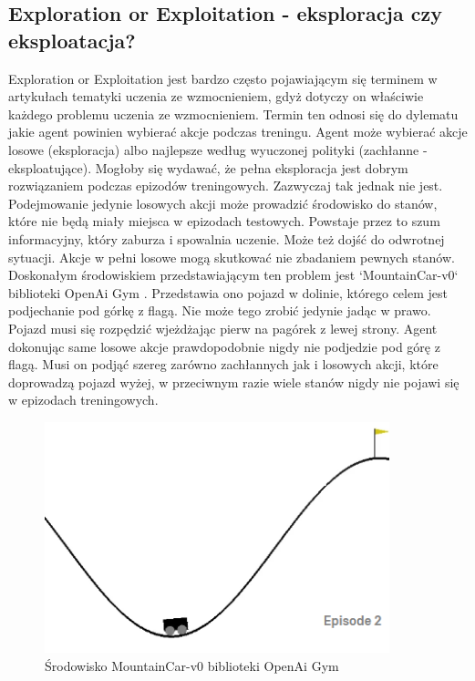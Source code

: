 \documentclass[12pt]{book}
\theoremstyle{plain}
\begin{document}
\subsection*{Exploration or Exploitation - eksploracja czy eksploatacja?}
Exploration or Exploitation jest bardzo często pojawiającym się terminem w artykułach tematyki uczenia ze wzmocnieniem\cite{exploration_or_exploitation}, gdyż dotyczy on właściwie każdego problemu uczenia ze wzmocnieniem. Termin ten odnosi się do dylematu jakie agent powinien wybierać akcje podczas treningu. Agent może wybierać akcje losowe (eksploracja) albo najlepsze według wyuczonej polityki (zachłanne - eksploatujące). Mogłoby się wydawać, że pełna eksploracja jest dobrym rozwiązaniem podczas epizodów treningowych. Zazwyczaj tak jednak nie jest. Podejmowanie jedynie losowych akcji może prowadzić środowisko do stanów, które nie będą miały miejsca w epizodach testowych. Powstaje przez to szum informacyjny, który zaburza i spowalnia uczenie. Może też dojść do odwrotnej sytuacji. Akcje w pełni losowe mogą skutkować nie zbadaniem pewnych stanów. Doskonałym środowiskiem przedstawiającym ten problem jest `MountainCar-v0` biblioteki OpenAi Gym \cite{openai}. Przedstawia ono pojazd w dolinie, którego celem jest podjechanie pod górkę z flagą. Nie może tego zrobić jedynie jadąc w prawo. Pojazd musi się rozpędzić wjeżdżając pierw na pagórek z lewej strony. Agent dokonując same losowe akcje prawdopodobnie nigdy nie podjedzie pod górę z flagą. Musi on podjąć szereg zarówno zachłannych jak i losowych akcji, które doprowadzą pojazd wyżej, w przeciwnym razie wiele stanów nigdy nie pojawi się w epizodach treningowych.
\begin{figure}[H]
	\centering
	\includegraphics[width=10cm]{images/mountain_car}
	\caption{Środowisko MountainCar-v0 biblioteki OpenAi Gym }
	\label{fig:mountain-ca}
\end{figure}\noindent
\end{document}
